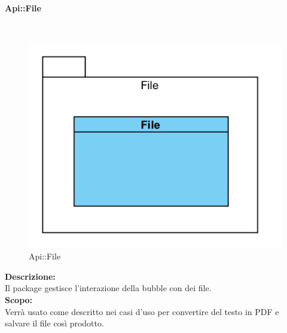 \begin{samepage}
\paragraph{Api\-::File}\label{api-file}\mbox{}\\
\begin{figure}[H]
	\centering
	\includegraphics[width=14cm]{diagrammi_img/classi_e_package/api_file.png}
	\caption{Api\-::File}
\end{figure}
\end{samepage}
\textbf{Descrizione:}\\ 
Il package gestisce l'interazione della bubble con dei file.\\ 
\textbf{Scopo:}\\
Verrà usato come descritto nei casi d'uso per convertire del testo in PDF e salvare il file così prodotto.

